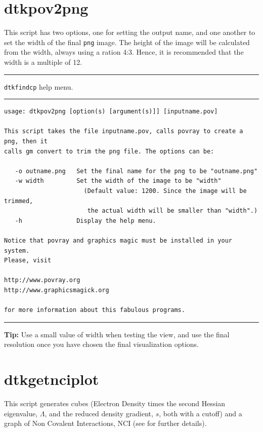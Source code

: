 \section{dtkpov2png}

This script has two options, one for setting the output name, and one another to set the width of the final \texttt{png} image. The height of the image will be calculated from the width, always using a ration 4:3. Hence, it is recommended that the width is a multiple of 12.

\rule{\textwidth}{1pt}
{\center\texttt{dtkfindcp} help menu.\\}
\rule{\textwidth}{1pt}
\begin{footnotesize}
\begin{verbatim}
usage: dtkpov2png [option(s) [argument(s)]] [inputname.pov]

This script takes the file inputname.pov, calls povray to create a png, then it
calls gm convert to trim the png file. The options can be:

   -o outname.png   Set the final name for the png to be "outname.png"
   -w width         Set the width of the image to be "width"
                      (Default value: 1200. Since the image will be trimmed, 
                       the actual width will be smaller than "width".)
   -h               Display the help menu.

Notice that povray and graphics magic must be installed in your system.
Please, visit

http://www.povray.org
http://www.graphicsmagick.org

for more information about this fabulous programs.
\end{verbatim}
\end{footnotesize}
\rule{\textwidth}{1pt}

\textbf{Tip:} Use a small value of width when testing the view, and use the final resolution once you have chosen the final visualization options.

\section{dtkgetnciplot}
This script generates cubes (Electron Density times the second Hessian eigenvalue, $\Lambda$,
and the reduced density gradient, $s$, both with
a cutoff) and a graph of Non Covalent Interactions, NCI (see \cite{bib:contreras2011} for further details).

